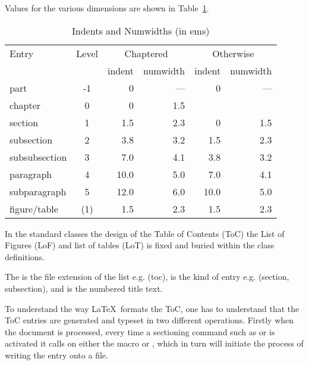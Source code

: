 Values for the various dimensions are shown in Table~\ref{tab:indents}.

 \begin{table}
 \centering
 \caption[Indents and Numwidths]{Indents and Numwidths (in ems)} \label{tab:indents}
 \begin{tabular}{lcrrrr} \hline
 Entry & Level & \multicolumn{2}{c}{Chaptered} & \multicolumn{2}{c}{Otherwise} \\
       &       & indent & numwidth & indent & numwidth \\ \hline
 part          & -1 & 0    & --- & 0    & --- \\
 chapter       & 0  & 0    & 1.5 &      &     \\
 section       & 1  & 1.5  & 2.3 & 0    & 1.5 \\
 subsection    & 2  & 3.8  & 3.2 & 1.5  & 2.3 \\
 subsubsection & 3  & 7.0  & 4.1 & 3.8  & 3.2 \\
 paragraph     & 4  & 10.0 & 5.0 & 7.0  & 4.1 \\
 subparagraph  & 5  & 12.0 & 6.0 & 10.0 & 5.0 \\
 figure/table  & (1) & 1.5 & 2.3 & 1.5  & 2.3 \\ \hline
 \end{tabular}
 \end{table}

In the standard classes the design of the Table of Contents (ToC) the List of Figures (LoF) and list of tables (LoT) is fixed and buried within the class definitions.

\begin{docCommands}
 {  } {}
The  is the file extension of the list e.g. (toc),  is the kind of entry e.g. (section, subsection), and  is the numbered title text.



\end{docCommands}

To understand the way \LaTeX\ formats the ToC, one has to understand that the ToC entries are generated and typeset in two different operations. Firstly when the document is processed, every time a sectioning command such as  or  is activated it calls on either the macro  or , which in turn will initiate the process of writing the entry onto a file.


